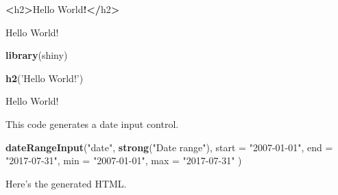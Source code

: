 \documentclass[]{article}
\newenvironment{Shaded}{\begin{snugshade}}{\end{snugshade}}
\newcommand{\DataTypeTok}[1]{\textcolor[rgb]{0.13,0.29,0.53}{#1}}
\newcommand{\ErrorTok}[1]{\textcolor[rgb]{0.64,0.00,0.00}{\textbf{#1}}}
\newcommand{\KeywordTok}[1]{\textcolor[rgb]{0.13,0.29,0.53}{\textbf{#1}}}
\newcommand{\NormalTok}[1]{#1}
\newcommand{\OperatorTok}[1]{\textcolor[rgb]{0.81,0.36,0.00}{\textbf{#1}}}
\newcommand{\StringTok}[1]{\textcolor[rgb]{0.31,0.60,0.02}{#1}}
\begin{document}
\begin{Shaded}
\begin{Highlighting}[]
\OperatorTok{<}\NormalTok{h2}\OperatorTok{>}\NormalTok{Hello World}\OperatorTok{!}\ErrorTok{</}\NormalTok{h2}\OperatorTok{>}
\end{Highlighting}
\end{Shaded}

Hello World!

\begin{Shaded}
\begin{Highlighting}[]
\KeywordTok{library}\NormalTok{(shiny)}

\KeywordTok{h2}\NormalTok{(}\StringTok{'Hello World!'}\NormalTok{)}
\end{Highlighting}
\end{Shaded}

Hello World!

This code generates a date input control.

\begin{Shaded}
\begin{Highlighting}[]
\KeywordTok{dateRangeInput}\NormalTok{(}\StringTok{"date"}\NormalTok{,}
               \KeywordTok{strong}\NormalTok{(}\StringTok{"Date range"}\NormalTok{),}
               \DataTypeTok{start =} \StringTok{"2007-01-01"}\NormalTok{,}
               \DataTypeTok{end =} \StringTok{"2017-07-31"}\NormalTok{,}
               \DataTypeTok{min =} \StringTok{"2007-01-01"}\NormalTok{,}
               \DataTypeTok{max =} \StringTok{"2017-07-31"}
\NormalTok{               )}
\end{Highlighting}
\end{Shaded}

Here's the generated HTML.
\end{document}
